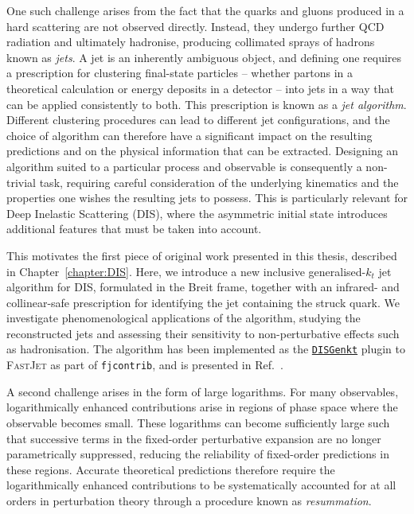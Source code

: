 One such challenge arises from the fact that the quarks and gluons produced in
a hard scattering are not observed directly. Instead, they undergo further QCD
radiation and ultimately hadronise, producing collimated sprays of hadrons known
as \emph{jets}. A jet is an inherently ambiguous object, and defining one
requires a prescription for clustering final-state particles -- whether partons
in a theoretical calculation or energy deposits in a detector -- into jets in a
way that can be applied consistently to both. This prescription is known as a
\emph{jet algorithm}. Different clustering procedures can lead to different jet
configurations, and the choice of algorithm can therefore have a significant
impact on the resulting predictions and on the physical information that can be
extracted. Designing an algorithm suited to a particular process and observable
is consequently a non-trivial task, requiring careful consideration of the
underlying kinematics and the properties one wishes the resulting jets to
possess. This is particularly relevant for Deep Inelastic Scattering (DIS),
where the asymmetric initial state introduces additional features that must be
taken into account.

This motivates the first piece of original work presented in this thesis, described in
Chapter~\ref{chapter:DIS}. Here, we introduce a new inclusive generalised-$k_t$ jet
algorithm for DIS, formulated in the Breit frame, together with an infrared- and collinear-safe
prescription for identifying the jet containing the struck quark. We investigate phenomenological applications of the algorithm, studying the reconstructed jets and assessing their sensitivity to non-perturbative effects such as hadronisation.
The algorithm has been implemented as the \href{https://repo.hepforge.org/source/fastjetsvn/browse/contrib/contribs/DISGenkt}{\texttt{DISGenkt}} plugin to \textsc{FastJet} as part of \texttt{fjcontrib}, and is presented in
Ref.~\cite{vanBeekveld:2026rez}.

A second challenge arises in the form of large logarithms. For many observables,
logarithmically enhanced contributions arise in regions of phase space where the
observable becomes small. These logarithms can become sufficiently large such that
successive terms in the fixed-order perturbative expansion are no longer
parametrically suppressed, reducing the reliability of fixed-order predictions
in these regions. Accurate theoretical predictions therefore require the
logarithmically enhanced contributions to be systematically accounted for at all orders
in perturbation theory through a procedure known as \emph{resummation}.

